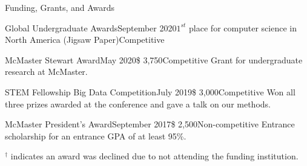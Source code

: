 \begin{rSection}{Funding, Grants, and Awards}
\begin{aSubsection}{Global Undergraduate Awards}{September 2020}{$1^{st}$ place for computer science in North America (Jigsaw Paper)}{Competitive}
\end{aSubsection}

\begin{aSubsection}{McMaster Stewart Award}{May 2020}{\$ 3,750}{Competitive}
Grant for undergraduate research at McMaster.\\
\end{aSubsection}


\begin{aSubsection}{STEM Fellowship Big Data Competition}{July 2019}{\$ 3,000}{Competitive}
Won all three prizes awarded at the conference and gave a talk on our methods. \\ 
\end{aSubsection}

\begin{aSubsection}{McMaster President's Award}{September 2017}{\$ 2,500}{Non-competitive}
Entrance scholarship for an entrance GPA of at least 95\%.\\
\end{aSubsection}

\smallskip
$^\dagger$ indicates an award was declined due to not attending the funding institution.

\end{rSection}

